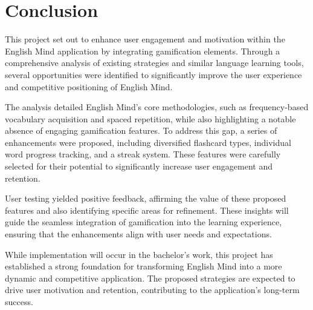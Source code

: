 \chapter{Conclusion}

This project set out to enhance user engagement and motivation within the English Mind application by integrating gamification elements. Through a comprehensive analysis of existing strategies and similar language learning tools, several opportunities were identified to significantly improve the user experience and competitive positioning of English Mind.

The analysis detailed English Mind's core methodologies, such as frequency-based vocabulary acquisition and spaced repetition, while also highlighting a notable absence of engaging gamification features. To address this gap, a series of enhancements were proposed, including diversified flashcard types, individual word progress tracking, and a streak system. These features were carefully selected for their potential to significantly increase user engagement and retention.

User testing yielded positive feedback, affirming the value of these proposed features and also identifying specific areas for refinement. These insights will guide the seamless integration of gamification into the learning experience, ensuring that the enhancements align with user needs and expectations.

While implementation will occur in the bachelor's work, this project has established a strong foundation for transforming English Mind into a more dynamic and competitive application. The proposed strategies are expected to drive user motivation and retention, contributing to the application's long-term success.